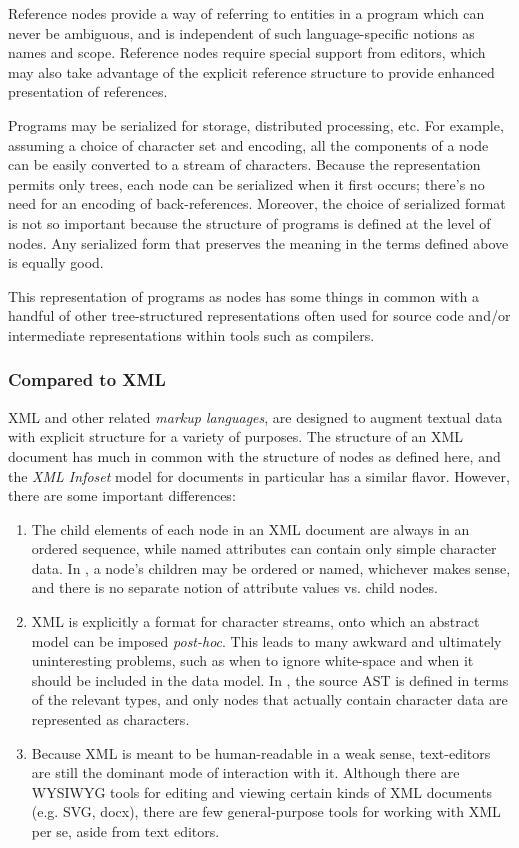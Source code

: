 Reference nodes provide a way of referring to entities in a program which can never be ambiguous, and is independent of such language-specific notions as names and scope. Reference nodes require special support from editors, which may also take advantage of the explicit reference structure to provide enhanced presentation of references.

Programs may be serialized for storage, distributed processing, etc. For example, assuming a choice of character set and encoding, all the components of a node can be easily converted to a stream of characters. Because the representation permits only trees, each node can be serialized when it first occurs; there's no need for an encoding of back-references. Moreover, the choice of serialized format is not so important because the structure of programs is defined at the level of nodes. Any serialized form that preserves the meaning in the terms defined above is equally good.

 This representation of programs as nodes has some things in common with a handful of other tree-structured representations often used for source code and/or intermediate representations within tools such as compilers.

\subsubsection{Compared to XML}
XML and other related \emph{markup languages}, are designed to augment textual data with explicit structure for a variety of purposes. The structure of an XML document has much in common with the structure of nodes as defined here, and the \emph{XML Infoset}\cite{infoset} model for documents in particular has a similar flavor. However, there are some important differences:
\begin{enumerate}
\item The child elements of each node in an XML document are always in an ordered sequence, while named attributes can contain only simple character data. In \Meta, a node's children may be ordered or named, whichever makes sense, and there is no separate notion of attribute values vs. child nodes.
\item XML is explicitly a format for character streams, onto which an abstract model can be imposed \textit{post-hoc}. This leads to many awkward and ultimately uninteresting problems, such as when to ignore white-space and when it should be included in the data model. In \Meta, the source AST is defined in terms of the relevant types, and only nodes that actually contain character data are represented as characters.
\item Because XML is meant to be human-readable in a weak sense, text-editors are still the dominant mode of interaction with it. Although there are WYSIWYG tools for editing and viewing certain kinds of XML documents (e.g. SVG\cite{svg}, docx\cite{openoffice}), there are few general-purpose tools for working with XML per se, aside from text editors.
\end{enumerate}

